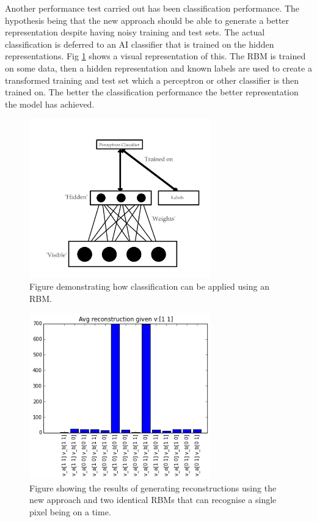 Another performance test carried out has been classification performance. The hypothesis being that the new approach should be able to generate a better representation despite having noisy training and test sets. The actual classification is deferred to an AI classifier that is trained on the hidden representations.
Fig \ref{F:rbmClassification} shows a visual representation of this. The RBM is trained on some data, then a hidden representation and known labels are used to create a transformed training and test set which a perceptron or other classifier is then trained on. The better the classification performance the better representation the model has achieved.
\begin{figure}[htbp]
\begin{center}
	\includegraphics[width=0.7\textwidth]{Assets/RBMClassification}
\caption[Figure demonstrating how classification can be applied using an RBM]{Figure demonstrating how classification can be applied using an RBM. }
\label{F:rbmClassification}
\end{center}
\end{figure}

\begin{figure}[htbp]
\begin{center}
	\includegraphics[width=0.7\textwidth]{Assets/yup}
\caption{Figure showing the results of generating reconstructions using the new approach and two identical RBMs that can recognise a single pixel being on a time.}
\label{F:twobit}
\end{center}
\end{figure}

